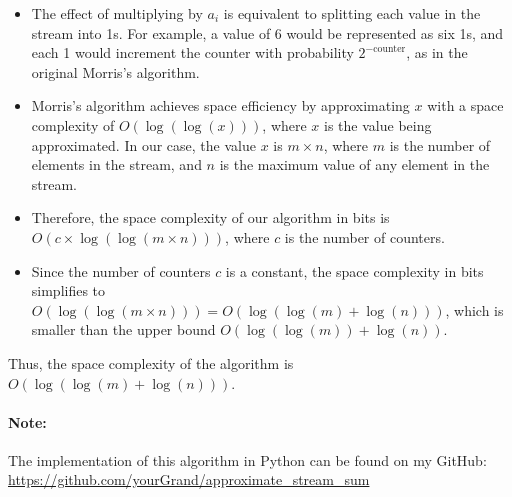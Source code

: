 \documentclass[12pt]{article}
\newenvironment{problem}[2][Problem]{\begin{trivlist}
\item[\hskip \labelsep {\bfseries #1}\hskip \labelsep {\bfseries #2.}]}{\end{trivlist}}
\begin{document}
\begin{problem}{1}
\begin{itemize}
        \item The effect of multiplying by \( a_i \) is equivalent to splitting each value in the stream into 1s. 
            For example, a value of 6 would be represented as six 1s, and each 1 would increment the 
            counter with probability \( 2^{-\text{counter}} \), as in the original Morris's algorithm.
        
        \item Morris's algorithm achieves space efficiency by approximating $x$ with a space complexity of
            \( O(\log(\log(x))) \), where \( x \) is the value being approximated. 
            In our case, the value \( x \) is \( m \times n \), where \( m \) is the number of elements 
            in the stream, and \( n \) is the maximum value of any element in the stream.
        
        \item Therefore, the space complexity of our algorithm in bits is \( O(c \times \log(\log(m \times n))) \),
            where $c$ is the number of counters.
        
        \item Since the number of counters \( c \) is a constant, the space complexity in bits simplifies to 
            \( O(\log(\log(m \times n))) =  O(\log(\log(m) + \log(n)))\), which is smaller than the upper bound 
            \( O(\log(\log(m)) + \log(n)) \).
    \end{itemize}

    Thus, the space complexity of the algorithm is \( O(\log(\log(m) + \log(n))) \).

    \paragraph{Note:}
    The implementation of this algorithm in Python can be found on my GitHub:\\
    \url{https://github.com/yourGrand/approximate_stream_sum}
\end{problem}
 
\end{document}
